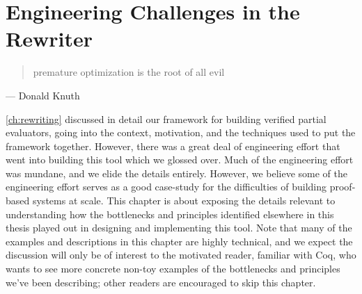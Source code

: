 \chapter{Engineering Challenges in the Rewriter}\label{ch:rewriting-more}
%

\begin{quote}
  premature optimization is the root of all evil
\end{quote}
\begin{flushright}
  --- Donald Knuth
\end{flushright}

\autoref{ch:rewriting} discussed in detail our framework for building verified partial evaluators, going into the context, motivation, and the techniques used to put the framework together.
However, there was a great deal of engineering effort that went into building this tool which we glossed over.
Much of the engineering effort was mundane, and we elide the details entirely.
However, we believe some of the engineering effort serves as a good case-study for the difficulties of building proof-based systems at scale.
This chapter is about exposing the details relevant to understanding how the bottlenecks and principles identified elsewhere in this thesis played out in designing and implementing this tool.
Note that many of the examples and descriptions in this chapter are highly technical, and we expect the discussion will only be of interest to the motivated reader, familiar with Coq, who wants to see more concrete non-toy examples of the bottlenecks and principles we've been describing; other readers are encouraged to skip this chapter.


